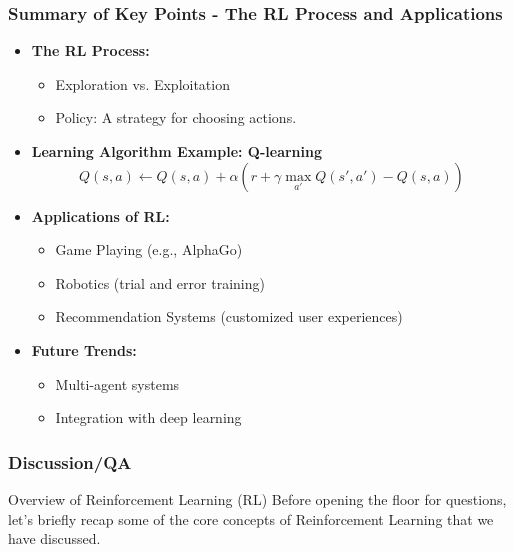 \documentclass[aspectratio=169]{beamer}
\begin{document}
\begin{frame}[fragile]
    \frametitle{Summary of Key Points - The RL Process and Applications}
    \begin{itemize}
        \item \textbf{The RL Process:}
        \begin{itemize}
            \item Exploration vs. Exploitation
            \item Policy: A strategy for choosing actions.
        \end{itemize}

        \item \textbf{Learning Algorithm Example: Q-learning}
        \begin{equation}
            Q(s, a) \leftarrow Q(s, a) + \alpha \left( r + \gamma \max_{a'} Q(s', a') - Q(s, a) \right)
        \end{equation}

        \item \textbf{Applications of RL:}
        \begin{itemize}
            \item Game Playing (e.g., AlphaGo)
            \item Robotics (trial and error training)
            \item Recommendation Systems (customized user experiences)
        \end{itemize}
        
        \item \textbf{Future Trends:}
        \begin{itemize}
            \item Multi-agent systems
            \item Integration with deep learning
        \end{itemize}
    \end{itemize}
\end{frame}

\begin{frame}[fragile]
    \frametitle{Discussion/QA}
    \begin{block}{Overview of Reinforcement Learning (RL)}
        Before opening the floor for questions, let's briefly recap some of the core concepts of Reinforcement Learning that we have discussed.
    \end{block}
\end{frame}
\end{document}
